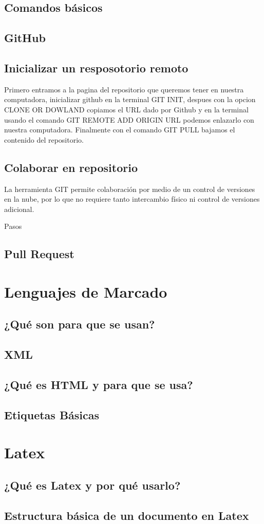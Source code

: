 \documentclass[11pt,letterpaper]{article}
\begin{document}
\subsection{Comandos básicos}

\subsection{GitHub}
\subsection{Inicializar un resposotorio remoto}

Primero entramos a la pagina del repositorio que queremos tener en nuestra computadora, inicializar github en la terminal GIT INIT, despues con la opcion CLONE OR DOWLAND copiamos el URL dado por Github y en la terminal usando el comando GIT REMOTE ADD ORIGIN URL podemos enlazarlo con nuestra computadora. Finalmente con el comando GIT PULL bajamos el contenido del repositorio.

\subsection{Colaborar en repositorio}
La herramienta GIT permite colaboración por medio de un control de versiones en la nube, por lo que no requiere tanto intercambio físico ni control de versiones adicional.

Pasos

\subsection{Pull Request}
\section{Lenguajes de Marcado}
\subsection{¿Qué son para que se usan?}
\subsection{XML}
\subsection{¿Qué es HTML y para que se usa?}
\subsection{Etiquetas Básicas}
\section{Latex}
\subsection{¿Qué es Latex y por qué usarlo?}
\subsection{Estructura básica de un documento en Latex}
\end{document}
